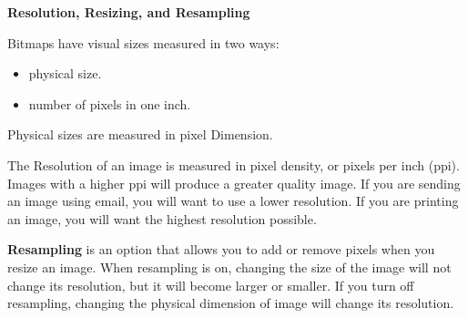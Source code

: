 \documentclass{report}
\begin{document}
    \bigbreak \noindent \bigbreak \noindent \bigbreak \noindent  
    \begin{Large}
        \textbf{Resolution, Resizing, and Resampling}
    \end{Large}

    \bigbreak \noindent 
    Bitmaps have visual sizes measured in two ways:
    \begin{itemize}
        \item physical size.
        \item number of pixels in one inch. 
    \end{itemize}

    \bigbreak \noindent 
    Physical sizes are measured in pixel Dimension. 

    \bigbreak \noindent 
    The Resolution of an image is measured in pixel density, or pixels per inch (ppi). Images 
    with a higher ppi will produce a greater quality image. If you are sending an image using
    email, you will want to use a lower resolution. If you are printing an image, you will
    want the highest resolution possible.

    \bigbreak \noindent 
    \textbf{Resampling} is an option that allows you to add or remove pixels when you resize an 
    image. When resampling is on, changing the size of the image will not change its resolution, but 
    it will become larger or smaller. If you turn off resampling, changing the physical dimension
    of image will change its resolution.
\end{document}
